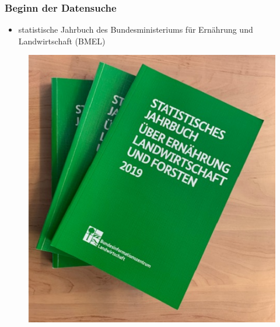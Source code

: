 \documentclass{beamer}
\begin{document}
\begin{frame}
	\frametitle{Beginn der Datensuche}
		\begin{itemize}
			\item statistische Jahrbuch des Bundesministeriums für Ernährung und Landwirtschaft (BMEL)
		\end{itemize}

		\begin{figure}[!tbp]
  			\centering
			\begin{minipage}[b]{0.3\textwidth}
    			\includegraphics[scale=0.15, width=\textwidth]{1_BMEL-Statistisches_Jahrbuch}
  			\end{minipage}
  		\hfill
			\begin{minipage}[b]{0.4\textwidth}

\end{minipage}
\end{figure}
\end{frame}
\end{document}
